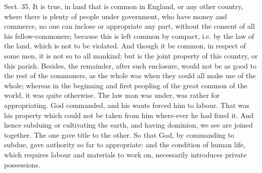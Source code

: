\documentclass[11pt,openany]{book}
\begin{document}
Sect. 35. It is true, in land that is common in England, or any other country, where there is plenty of people under government, who have money and commerce, no one can inclose or appropriate any part, without the consent of all his fellow-commoners; because this is left common by compact, i.e. by the law of the land, which is not to be violated. And though it be common, in respect of some men, it is not so to all mankind; but is the joint property of this country, or this parish. Besides, the remainder, after such enclosure, would not be as good to the rest of the commoners, as the whole was when they could all make use of the whole; whereas in the beginning and first peopling of the great common of the world, it was quite otherwise. The law man was under, was rather for appropriating. God commanded, and his wants forced him to labour. That was his property which could not be taken from him where-ever he had fixed it. And hence subduing or cultivating the earth, and having dominion, we see are joined together. The one gave title to the other. So that God, by commanding to subdue, gave authority so far to appropriate: and the condition of human life, which requires labour and materials to work on, necessarily introduces private possessions.
\end{document}

